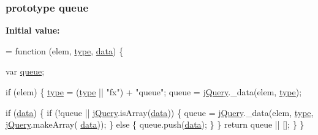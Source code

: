 \subsubsection[{\texorpdfstring{queue}{queue}}]{ {\bf prototype} queue}\hypertarget{jquery-2_82_81-vsdoc_8js_a4a4ce67ab280eb2cff0622a3bdc1f5b3}{}\label{jquery-2_82_81-vsdoc_8js_a4a4ce67ab280eb2cff0622a3bdc1f5b3}
{\bfseries Initial value\+:}
\begin{DoxyCode}
= \textcolor{keyword}{function} (elem, \hyperlink{jquery-2_82_81-vsdoc_8js_a3940565e83a9bfd10d95ffd27536da91}{type}, \hyperlink{jquery-2_82_81-vsdoc_8js_a609407b3456fdc3c5671a9fc4a226ff7}{data}) \{
        

        var \hyperlink{jquery-2_82_81-vsdoc_8js_a4a4ce67ab280eb2cff0622a3bdc1f5b3}{queue};

        \textcolor{keywordflow}{if} (elem) \{
            \hyperlink{jquery-2_82_81-vsdoc_8js_a3940565e83a9bfd10d95ffd27536da91}{type} = (\hyperlink{jquery-2_82_81-vsdoc_8js_a3940565e83a9bfd10d95ffd27536da91}{type} || \textcolor{stringliteral}{"fx"}) + \textcolor{stringliteral}{"queue"};
            queue = \hyperlink{jquery-2_82_81-vsdoc_8js_add5237586d970a38a81f990e8eb28c6c}{jQuery}.\_data(elem, \hyperlink{jquery-2_82_81-vsdoc_8js_a3940565e83a9bfd10d95ffd27536da91}{type});

            
            \textcolor{keywordflow}{if} (\hyperlink{jquery-2_82_81-vsdoc_8js_a609407b3456fdc3c5671a9fc4a226ff7}{data}) \{
                \textcolor{keywordflow}{if} (!queue || \hyperlink{jquery-2_82_81-vsdoc_8js_add5237586d970a38a81f990e8eb28c6c}{jQuery}.isArray(\hyperlink{jquery-2_82_81-vsdoc_8js_a609407b3456fdc3c5671a9fc4a226ff7}{data})) \{
                    queue = \hyperlink{jquery-2_82_81-vsdoc_8js_add5237586d970a38a81f990e8eb28c6c}{jQuery}.\_data(elem, \hyperlink{jquery-2_82_81-vsdoc_8js_a3940565e83a9bfd10d95ffd27536da91}{type}, \hyperlink{jquery-2_82_81-vsdoc_8js_add5237586d970a38a81f990e8eb28c6c}{jQuery}.makeArray(
      \hyperlink{jquery-2_82_81-vsdoc_8js_a609407b3456fdc3c5671a9fc4a226ff7}{data}));
                \} \textcolor{keywordflow}{else} \{
                    queue.push(\hyperlink{jquery-2_82_81-vsdoc_8js_a609407b3456fdc3c5671a9fc4a226ff7}{data});
                \}
            \}
            \textcolor{keywordflow}{return} queue || [];
        \}
    \}
\end{DoxyCode}
